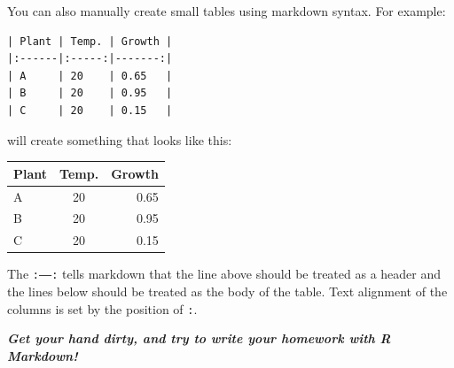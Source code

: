 \documentclass[
  11pt,
]{article}
\begin{document}
You can also manually create small tables using markdown syntax. For
example:

\begin{verbatim}
| Plant | Temp. | Growth |
|:------|:-----:|-------:|
| A     | 20    | 0.65   |
| B     | 20    | 0.95   |
| C     | 20    | 0.15   |
\end{verbatim}

will create something that looks like this:

\begin{longtable}[]{@{}lcr@{}}
\toprule()
Plant & Temp. & Growth \\
\midrule()
\endhead
A & 20 & 0.65 \\
B & 20 & 0.95 \\
C & 20 & 0.15 \\
\bottomrule()
\end{longtable}

The \texttt{:-----:} tells markdown that the line above should be
treated as a header and the lines below should be treated as the body of
the table. Text alignment of the columns is set by the position of
\texttt{:}.

\emph{\textbf{Get your hand dirty, and try to write your homework with R
Markdown!}}
\end{document}
